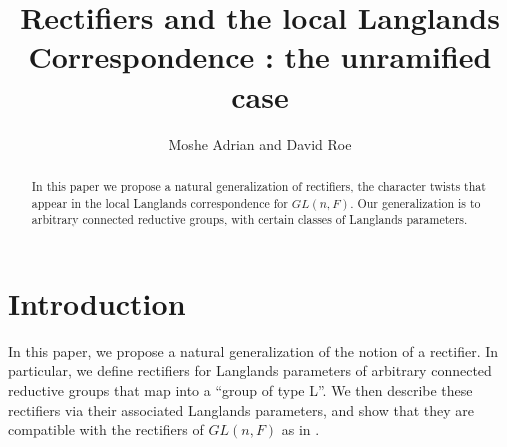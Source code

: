 \documentclass[11pt]{amsart}
\theoremstyle{plain}
\theoremstyle{definition}
\begin{document}
\title{Rectifiers and the local Langlands Correspondence : the unramified case}
\author{Moshe Adrian and David Roe}





\maketitle

\begin{abstract}

In this paper we propose a natural generalization of rectifiers, the
character twists that appear in the local Langlands correspondence for
$GL(n,F)$.  Our generalization is to arbitrary connected reductive
groups, with certain classes of Langlands parameters.

\end{abstract}

\section{Introduction}
In this paper, we propose a natural generalization of the notion of a
rectifier.  In particular, we define rectifiers for Langlands
parameters of arbitrary connected reductive groups that map into a
``group of type L''.  We then describe these rectifiers via their
associated Langlands parameters, and show that they are compatible
with the rectifiers of $GL(n,F)$ as in \cite{bushnellhenniart}.
\end{document}
